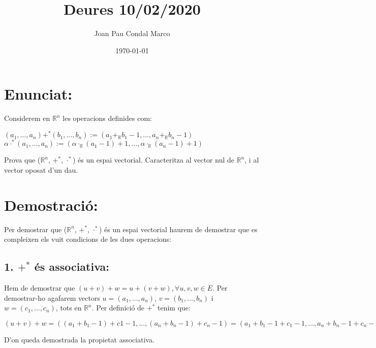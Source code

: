 \documentclass[a4paper, 9pt]{article}
\title{Deures 10/02/2020}
\author{Joan Pau Condal Marco}
\date{\today}
\begin{document}
    \maketitle
    \justify
    \section*{Enunciat:}

    Considerem en ${\mathbb{R}^n}$ les operacions definides com:
    \begin{center}
        \begin{math}
            (a_1, \dots , a_n) +^* (b_1, \dots , b_n) := (a_1 +_{\mathbb{R}} b_1 - 1, \dots , a_n +_{\mathbb{R}} b_n -1) 
        \end{math}
        \begin{math}
            \alpha \cdot^* (a_1, \dots , a_n) := (\alpha \cdot_{\mathbb{R}} (a_1 -1)+1, \dots , \alpha \cdot_{\mathbb{R}} (a_n -1)+1)
        \end{math}
    \end{center}
    Prova que (${\mathbb{R}}^n$, ${+^*}$, ${\cdot^*}$) \'es un espai vectorial. Caracteritza al vector nul de ${\mathbb{R}^n}$, i al vector oposat d'un dau.  \\

    \section*{Demostraci\'o:}
    Per demostrar que (${\mathbb{R}}^n$, ${+^*}$, ${\cdot^*}$) \'es un espai vectorial haurem de demostrar que es compleixen els vuit condicions de les dues operacions:
    
    \subsection*{1. ${+^*}$ \'es associativa:}
        Hem de demostrar que ${(u+v)+w = u+(v+w), \forall u,v,w \in E}$. Per demostrar-ho agafarem vectors ${u = (a_1, \dots , a_n)}$, ${v = (b_1, \dots , b_n)}$ i ${w = (c_1, \dots , c_n)}$, tots en ${\mathbb{R}^n}$. Per definici\'o de ${+^*}$ tenim que:
        \begin{center}
            \begin{math}
                (u+v)+w = ((a_1+b_1-1)+c1-1,\dots,(a_n+b_n-1)+c_n-1) = (a_1+b_1-1+c_1-1,\dots,a_n+b_n-1+c_n-1) = (a_1+(b_1+c_1-1)-1,\dots,a_n+(b_n+c_n-1)-1) = u+(v+w)
            \end{math}
        \end{center}
        D'on queda demostrada la propietat associativa.
\end{document}
